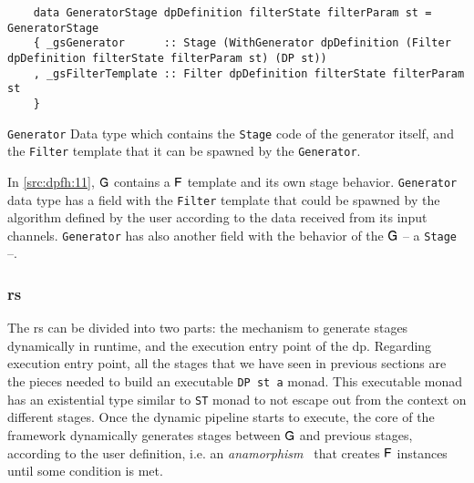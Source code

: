 \begin{listing}[H]
  \begin{verbatim}
    data GeneratorStage dpDefinition filterState filterParam st = GeneratorStage
    { _gsGenerator      :: Stage (WithGenerator dpDefinition (Filter dpDefinition filterState filterParam st) (DP st))
    , _gsFilterTemplate :: Filter dpDefinition filterState filterParam st
    }  
  \end{verbatim}
  \caption[{[\texttt{Stage.hs}] Generator}]{\texttt{Generator} Data type which contains the \texttt{Stage} code of the generator itself, and the \texttt{Filter} template that it can be spawned by the \texttt{Generator}.}
  \label{src:dpfh:11}
\end{listing}

In \autoref{src:dpfh:11}, $\mathsf{G}$ contains a $\mathsf{F}$ template and its own stage behavior.
\texttt{Generator} data type has a field with the \texttt{Filter} template that could be spawned by the algorithm defined by the user according to the data received from its input channels.
\texttt{Generator} has also another field with the behavior of the $\mathsf{G}$ -- a \texttt{Stage} --. 

\subsubsection{\acrfull{rs}}
The \acrshort{rs} can be divided into two parts: the mechanism to generate stages dynamically in runtime, and the execution entry point of the \acrshort{dp}.
Regarding execution entry point, all the stages that we have seen in previous sections are the pieces needed to build an executable \texttt{DP st a} monad.
This executable monad has an existential type similar to \texttt{ST} monad to not escape out from the context on different stages.
Once the dynamic pipeline starts to execute, the core of the framework dynamically generates stages between $\mathsf{G}$ and previous stages, according to the user definition, i.e. an \emph{anamorphism}~\cite{lenses} that creates $\mathsf{F}$ instances until some condition is met.

